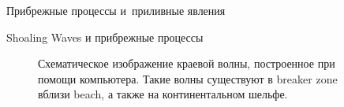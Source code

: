 \begin{chapter}{Прибрежные процессы и~приливные явления}
\begin{section}{Shoaling Waves и прибрежные процессы}
\begin{figure}[h!]
\caption{Схематическое изображение краевой волны, построенное при помощи
компьютера. Такие волны существуют в breaker zone вблизи beach,
а также на континентальном шельфе.~\cite{Cutchin:1973}}
\label{fig:edgewave}
\end{figure}
%
%
\end{section}


\end{chapter}
